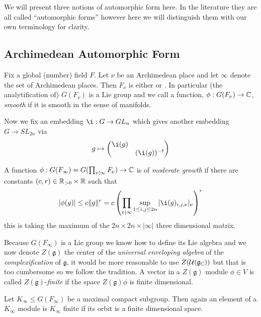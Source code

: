 We will present three notions of automorphic form here. In the literature they are all called ``automorphic forms'' however here we will distinguish them with our own terminology for clarity.

\subsection{Archimedean Automorphic Form}
Fix a global (number) field \(F\). Let \(\nu\) be an Archimedean place and let \(\infty\) denote the set of Archimedean places. Then \(F_\nu\) is either \R or \C. In particular (the analytification of) \(G(F_\nu)\) is a Lie group and we call a function, \(\phi: G(F_\nu) \to \C\), \textit{smooth}  if it is smooth in the sense of manifolds.


Now we fix an embedding \(\i : G\to GL_n\) which gives another embedding \(G\to SL_{2n}\) via
	\[g\mapsto \begin{pmatrix}
		\i (g) & \\
		 & (\i (g))^{-t}
	\end{pmatrix}\]

	A function \(\phi : G(F_\infty) = G(\prod_{v|\infty} F_\nu) \to \C \) is of \textit{moderate growth} if there are constants \((c,r)\in \R_{>0}\times \R\) such that 
	\[|\phi(g)| \leq c\norm{g}^r = c \left(\prod_{v|\infty} \sup_{1\leq i, j\leq 2n} |\i (g)_{i,j, \nu}|_\nu\right)^r\]
	this is taking the maximum of the \(2n\times 2n \times |\infty| \) three dimensional matrix. 


    Because \(G(F_\infty)\) is a Lie group we know how to define its Lie algebra and we now denote \(Z(\mathfrak{g})\) the center of the \textit{universal enveloping algebra} of the \textit{complexification} of \(\mathfrak{g}\), it would be more reasonable to use \(Z(\mathcal{U}(\mathfrak{g}_{\C}))\) but that is too cumbersome so we follow the tradition. 
    A vector in a \(Z(\mathfrak{g})\) module \(\phi\in V\) is called \(Z(\mathfrak{g})\)-\textit{finite} if the space \(Z(\mathfrak{g})\phi\) is finite dimensional. 

	Let \(K_\infty\leq G(F_\infty)\) be a maximal compact subgroup. Then again an element of a \(K_\infty\) module is \(K_\infty\) finite if its orbit is a finite dimensional  space.

